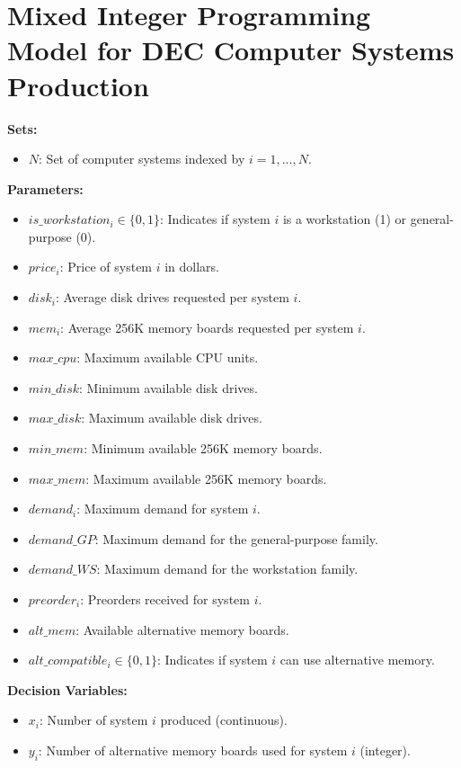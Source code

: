 \documentclass{article}
\begin{document}
\section*{Mixed Integer Programming Model for DEC Computer Systems Production}

\textbf{Sets:}
\begin{itemize}
    \item $N$: Set of computer systems indexed by $i = 1, \ldots, N$.
\end{itemize}

\textbf{Parameters:}
\begin{itemize}
    \item $is\_workstation_i \in \{0, 1\}$: Indicates if system $i$ is a workstation (1) or general-purpose (0).
    \item $price_i$: Price of system $i$ in dollars.
    \item $disk_i$: Average disk drives requested per system $i$.
    \item $mem_i$: Average 256K memory boards requested per system $i$.
    \item $max\_cpu$: Maximum available CPU units.
    \item $min\_disk$: Minimum available disk drives.
    \item $max\_disk$: Maximum available disk drives.
    \item $min\_mem$: Minimum available 256K memory boards.
    \item $max\_mem$: Maximum available 256K memory boards.
    \item $demand_i$: Maximum demand for system $i$.
    \item $demand\_GP$: Maximum demand for the general-purpose family.
    \item $demand\_WS$: Maximum demand for the workstation family.
    \item $preorder_i$: Preorders received for system $i$.
    \item $alt\_mem$: Available alternative memory boards.
    \item $alt\_compatible_i \in \{0, 1\}$: Indicates if system $i$ can use alternative memory.
\end{itemize}

\textbf{Decision Variables:}
\begin{itemize}
    \item $x_i$: Number of system $i$ produced (continuous).
    \item $y_i$: Number of alternative memory boards used for system $i$ (integer).
\end{itemize}
\end{document}
